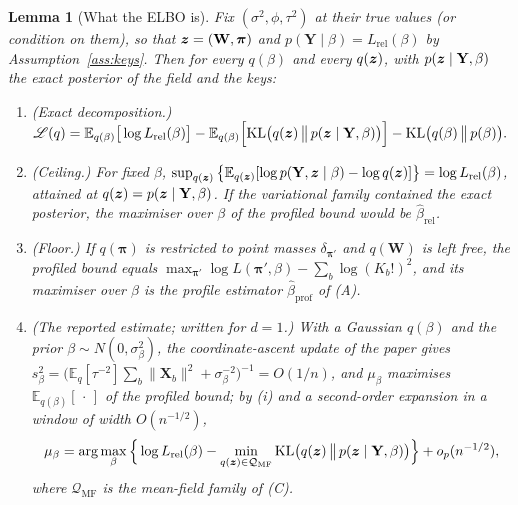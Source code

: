 \documentclass[11pt]{article}
\newtheorem{lemma}{Lemma}
\theoremstyle{definition}
\newcommand{\bX}{\mathbf{X}}
\newcommand{\bY}{\mathbf{Y}}
\newcommand{\bW}{\mathbf{W}}
\newcommand{\bpi}{\boldsymbol{\pi}}
\newcommand{\E}{\mathbb{E}}
\newcommand{\rel}{\mathrm{rel}}
\begin{document}
\begin{lemma}[What the ELBO is]\label{lem:elbo}
Fix $(\sigma^2,\phi,\tau^2)$ at their true values (or condition on them), so that $\bz=(\bW,\bpi)$ and $p(\bY\mid\beta)=L_\rel(\beta)$ by Assumption~\ref{ass:keys}. Then for every $q(\beta)$ and every $q(\bm{z})$, with $p(\bz\mid\bY,\beta)$ the exact posterior of the field and the keys:
\begin{enumerate}
\item[(i)] (Exact decomposition.) $\displaystyle \mathscr L(q)=\E_{q(\beta)}\big[\log L_\rel(\beta)\big]-\E_{q(\beta)}\Big[\mathrm{KL}\big(q(\bz)\,\big\|\,p(\bz\mid\bY,\beta)\big)\Big]-\mathrm{KL}\big(q(\beta)\,\big\|\,p(\beta)\big).$
\item[(ii)] (Ceiling.) For fixed $\beta$, $\sup_{q(\bz)}\big\{\E_{q(\bz)}[\log p(\bY,\bz\mid\beta)-\log q(\bz)]\big\}=\log L_\rel(\beta)$, attained at $q(\bz)=p(\bz\mid\bY,\beta)$. If the variational family contained the exact posterior, the maximiser over $\beta$ of the profiled bound would be $\hat\beta_\rel$.
\item[(iii)] (Floor.) If $q(\bpi)$ is restricted to point masses $\delta_{\bpi'}$ and $q(\bW)$ is left free, the profiled bound equals $\max_{\bpi'}\log L(\bpi',\beta)-\sum_b\log(K_b!)^2$, and its maximiser over $\beta$ is the profile estimator $\hat\beta_{\mathrm{prof}}$ of (A).
\item[(iv)] (The reported estimate; written for $d=1$.) With a Gaussian $q(\beta)$ and the prior $\beta\sim N(0,\sigma_\beta^2)$, the coordinate-ascent update of the paper gives $s_\beta^2=\big(\E_q[\tau^{-2}]\sum_b\|\bX_b\|^2+\sigma_\beta^{-2}\big)^{-1}=O(1/n)$, and $\mu_\beta$ maximises $\E_{q(\beta)}[\,\cdot\,]$ of the profiled bound; by (i) and a second-order expansion in a window of width $O(n^{-1/2})$,
\begin{equation}\label{eq:vfe}
\mu_\beta=\arg\max_\beta\Big\{\log L_\rel(\beta)-\min_{q(\bz)\in\mathcal Q_{\mathrm{MF}}}\mathrm{KL}\big(q(\bz)\,\big\|\,p(\bz\mid\bY,\beta)\big)\Big\}+o_p(n^{-1/2}),
\end{equation}
where $\mathcal Q_{\mathrm{MF}}$ is the mean-field family of (C).
\end{enumerate}
\end{lemma}
\end{document}
